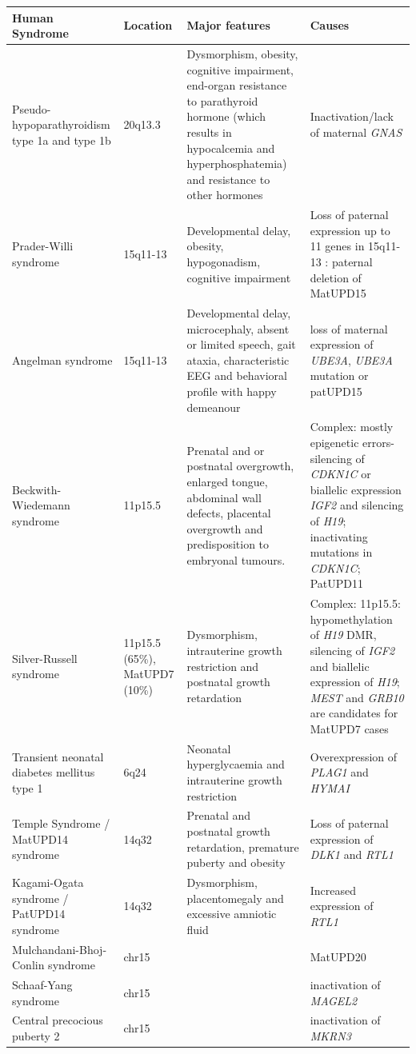 \begin{table}
\centering
\begin{adjustbox}{width=1\textwidth}
\begin{tabular}{@{}p{3cm}p{2cm}p{7cm}p{7cm}@{}}
\toprule Human Syndrome & Location & Major features & Causes \\ \midrule 
Pseudo-hypoparathyroidism type 1a and type 1b\cite{Mantovani:2016em,Elli:2016et}  & 20q13.3 & Dysmorphism, obesity, cognitive impairment, end-organ resistance to parathyroid hormone (which results in hypocalcemia and hyperphosphatemia) and resistance to other hormones & Inactivation/lack of maternal \emph{GNAS} \\ 
Prader-Willi syndrome\cite{Buiting:2010ci} & 15q11-13 & Developmental delay, obesity, hypogonadism, cognitive impairment & Loss of paternal expression up to 11 genes in 15q11-13 : paternal deletion of MatUPD15\\  
Angelman syndrome\cite{Buiting:2010ci}  & 15q11-13 & Developmental delay, microcephaly, absent or limited speech, gait ataxia, characteristic EEG and behavioral profile with happy demeanour & loss of maternal expression of \emph{UBE3A}, \emph{UBE3A} mutation or patUPD15\\
Beckwith-Wiedemann syndrome\cite{Choufani:2010ca} & 11p15.5 & Prenatal and or postnatal overgrowth, enlarged tongue, abdominal wall defects, placental overgrowth and predisposition to embryonal tumours. & Complex: mostly epigenetic errors- silencing of \emph{CDKN1C} or biallelic expression \emph{IGF2} and silencing of \emph{H19}; inactivating mutations in \emph{CDKN1C}; PatUPD11\\
Silver-Russell syndrome\cite{Eggermann:2010gl,Wakeling:2017kv} & 11p15.5 (65\%), MatUPD7  (10\%) & Dysmorphism, intrauterine growth restriction and postnatal growth retardation & Complex: 11p15.5: hypomethylation of \emph{H19} DMR, silencing of \emph{IGF2} and biallelic expression of \emph{H19}; \emph{MEST} and \emph{GRB10} are candidates for MatUPD7 cases\\
Transient neonatal diabetes mellitus type 1\cite{Mackay:2006bv} & 6q24& Neonatal hyperglycaemia and intrauterine growth restriction & Overexpression of \emph{PLAG1} and \emph{HYMAI}\\
Temple Syndrome\cite{Ioannides:2014ka,Kagami:2017gp} / MatUPD14 syndrome & 14q32 & Prenatal and postnatal growth retardation, premature puberty and obesity & Loss of paternal expression of \emph{DLK1} and \emph{RTL1} \\
Kagami-Ogata syndrome\cite{Kagami:2015gn,Kagami:2017gp,Ogata:2016jb} / PatUPD14 syndrome & 14q32 & Dysmorphism, placentomegaly and excessive amniotic fluid & Increased expression of \emph{RTL1}\\
Mulchandani-Bhoj-Conlin syndrome\cite{Mulchandani:2016kf} & chr15 & & MatUPD20\\
Schaaf-Yang syndrome\cite{Fountain:2017dd} & chr15  & & inactivation of \emph{MAGEL2}\\
Central precocious puberty 2\cite{Abreu:2013je} & chr15 & & inactivation of \emph{MKRN3}\\


\end{tabular}
\end{adjustbox}
\end{table}
